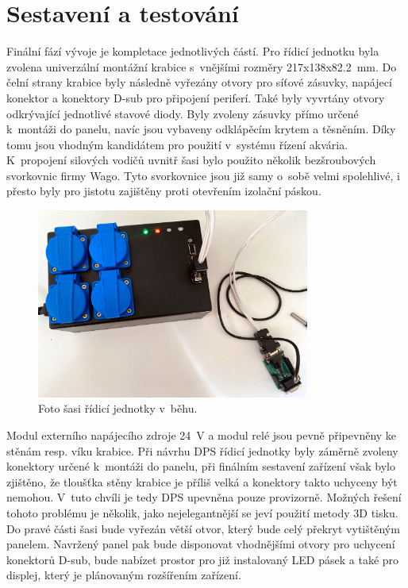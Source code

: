\chapter{Sestavení a testování}

Finální fází vývoje je kompletace jednotlivých částí. Pro řídicí jednotku byla zvolena univerzální montážní krabice s~vnějšími rozměry 217x138x\qty{82.2}{mm}. Do čelní strany krabice byly následně vyřezány otvory pro síťové zásuvky, napájecí konektor a konektory D-sub pro připojení periferí. Také byly vyvrtány otvory odkrývající jednotlivé stavové diody. Byly zvoleny zásuvky přímo určené k~montáži do panelu, navíc jsou vybaveny odklápěcím krytem a těsněním. Díky tomu jsou vhodným kandidátem pro použití v~systému řízení akvária. K~propojení silových vodičů uvnitř šasi bylo použito několik bezšroubových svorkovnic firmy Wago. Tyto svorkovnice jsou již samy o~sobě velmi spolehlivé, i přesto byly pro jistotu zajištěny proti otevřením izolační páskou. 

\begin{figure}[h!]
    \centering
    \includegraphics[width=0.8\textwidth]{obrazky/foto/zarizeni_beh.jpeg}
    \caption{Foto šasi řídicí jednotky v~běhu.}
    \label{fig:obrazky-foto-zarizeni_beh-jpeg}
\end{figure}

Modul externího napájecího zdroje \qty{24}{V} a modul relé jsou pevně připevněny ke stěnám resp. víku krabice. Při návrhu DPS řídicí jednotky byly záměrně zvoleny konektory určené k~montáži do panelu, při finálním sestavení zařízení však bylo zjištěno, že tloušťka stěny krabice je příliš velká a konektory takto uchyceny být nemohou. V~tuto chvíli je tedy DPS upevněna pouze provizorně. Možných řešení tohoto problému je několik, jako nejelegantnější se jeví použití metody 3D tisku. Do pravé části šasi bude vyřezán větší otvor, který bude celý překryt vytištěným panelem. Navržený panel pak bude disponovat vhodnějšími otvory pro uchycení konektorů D-sub, bude nabízet prostor pro již instalovaný LED pásek a také pro displej, který je plánovaným rozšířením zařízení.  

